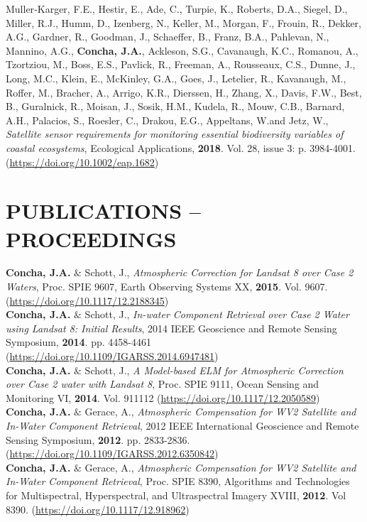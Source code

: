 \documentclass[11pt]{res}
\begin{document}
\begin{resume}
Muller‐Karger, F.E., Hestir, E., Ade, C., Turpie, K., Roberts, D.A., Siegel, D., Miller, R.J., Humm, D., Izenberg, N., Keller, M., Morgan, F., Frouin, R., Dekker, A.G., Gardner, R., Goodman, J., Schaeffer, B., Franz, B.A., Pahlevan, N., Mannino, A.G., {\bf Concha, J.A.}, Ackleson, S.G., Cavanaugh, K.C., Romanou, A., Tzortziou, M., Boss, E.S., Pavlick, R., Freeman, A., Rousseaux, C.S., Dunne, J., Long, M.C., Klein, E., McKinley, G.A., Goes, J., Letelier, R., Kavanaugh, M., Roffer, M., Bracher, A., Arrigo, K.R., Dierssen, H., Zhang, X., Davis, F.W., Best, B., Guralnick, R., Moisan, J., Sosik, H.M., Kudela, R., Mouw, C.B., Barnard, A.H., Palacios, S., Roesler, C., Drakou, E.G., Appeltans, W.and Jetz, W., {\it Satellite sensor requirements for monitoring essential biodiversity variables of coastal ecosystems}, Ecological Applications, {\bf 2018}. Vol. 28, issue 3: p. 3984-4001. (\url{https://doi.org/10.1002/eap.1682})

\section{PUBLICATIONS -- PROCEEDINGS}
\vspace{0.05in}
{\bf Concha, J.A.} $\&$ Schott, J., {\it Atmospheric Correction for Landsat 8 over Case 2 Waters}, Proc. SPIE 9607, Earth Observing Systems XX, {\bf 2015}. Vol. 9607. (\url{https://doi.org/10.1117/12.2188345})
\vspace{0.1in}\\
{\bf Concha, J.A.} $\&$ Schott, J., {\it In-water Component Retrieval over Case 2 Water using Landsat 8: Initial Results}, 2014 IEEE Geoscience and Remote Sensing Symposium, {\bf 2014}. pp. 4458-4461 (\url{https://doi.org/10.1109/IGARSS.2014.6947481})
\vspace{0.1in}\\
{\bf Concha, J.A.} $\&$ Schott, J., {\it A Model-based ELM for Atmospheric Correction over Case 2 water with Landsat 8}, Proc. SPIE 9111, Ocean Sensing and Monitoring VI, {\bf 2014}. Vol. 911112 (\url{https://doi.org/10.1117/12.2050589})
\vspace{0.1in}\\
{\bf Concha, J.A.} $\&$ Gerace, A., {\it Atmospheric Compensation for WV2 Satellite and In-Water Component Retrieval}, 2012 IEEE International Geoscience and Remote Sensing Symposium, {\bf 2012}. pp. 2833-2836. (\url{https://doi.org/10.1109/IGARSS.2012.6350842})
\vspace{0.1in}\\
{\bf Concha, J.A.} $\&$ Gerace, A., {\it Atmospheric Compensation for WV2 Satellite and In-Water Component Retrieval}, Proc. SPIE 8390, Algorithms and Technologies for Multispectral, Hyperspectral, and Ultraspectral Imagery XVIII, {\bf 2012}. Vol 8390. (\url{https://doi.org/10.1117/12.918962})

\end{resume}
\end{document}
